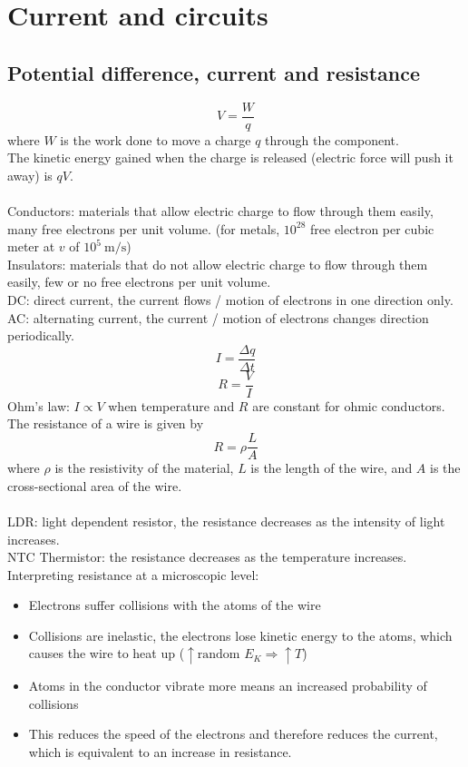 \documentclass[a4paper,12pt]{article}
\begin{document}
\section{Current and circuits}
\subsection{Potential difference, current and resistance}
$$V=\dfrac{W}{q}$$
where $W$ is the work done to move a charge $q$ through the component.\\
The kinetic energy gained when the charge is released (electric force will push it away) is $qV$.\\\\
Conductors: materials that allow electric charge to flow through them easily, many free electrons per unit volume. (for metals, $10^{28}$ free electron per cubic meter at $v$ of $10^5\ \text{m/s}$)\\
Insulators: materials that do not allow electric charge to flow through them easily, few or no free electrons per unit volume.\\
DC: direct current, the current flows / motion of electrons in one direction only.\\
AC: alternating current, the current / motion of electrons changes direction periodically.\\
$$I=\dfrac{\Delta q}{\Delta t}$$
$$R=\dfrac{V}{I}$$
Ohm's law: $I\propto V$ when temperature and $R$ are constant for ohmic conductors.\\
The resistance of a wire is given by
\[R=\rho\dfrac{L}{A}\]
where $\rho$ is the resistivity of the material, $L$ is the length of the wire, and $A$ is the cross-sectional area of the wire.\\\\
LDR: light dependent resistor, the resistance decreases as the intensity of light increases.\\
NTC Thermistor: the resistance decreases as the temperature increases.\\
Interpreting resistance at a microscopic level: 
\begin{itemize}
  \item Electrons suffer collisions with the atoms of the wire
  \item Collisions are inelastic, the electrons lose kinetic energy to the atoms, which causes the wire to heat up ($\uparrow \text{random }E_K \Rightarrow \uparrow T$)
  \item Atoms in the conductor vibrate more means an increased probability of collisions
  \item This reduces the speed of the electrons and therefore reduces the current, which is equivalent to an increase in resistance.
\end{itemize}
\end{document}
